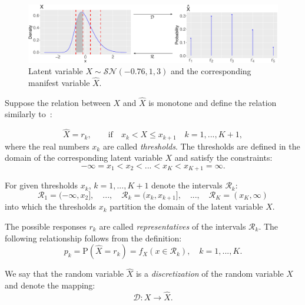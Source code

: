 \documentclass[10pt]{article}
\begin{document}
\begin{figure}[t]
	\centering
	\includegraphics[width=\textwidth]{model.pdf}
	\caption{ Latent variable $X \sim \mathcal{SN}(-0.76, 1, 3)$ and the corresponding manifest variable $\hat{X}$.}
	\label{fig: model}
\end{figure}

Suppose the relation between $X$ and $\hat{X}$ is monotone and define the relation similarly to~\cite{Boari}:

\begin{equation} \label{eq: definicija}
\hat{X} = r_{k}, \qquad \text{if} \quad x_{k} < X \leq x_{k+1} \quad k = 1, ..., K+1,
\end{equation}
where the real numbers $x_{k}$ are called {\it thresholds}. The thresholds are defined in the domain of the corresponding latent variable $X$ and satisfy the constraints:
\begin{equation} \label{eq: constraints}
-\infty = x_{1} < x_{2} < ... < x_{K} < x_{K + 1} = \infty.
\end{equation}

For given thresholds $x_{k}$, $k = 1,...,K+1$ denote the intervals $\mathcal{R}_{k}$:  
\begin{equation}
\mathcal{R}_{1} = (-\infty, x_{2}], \quad ..., \quad \mathcal{R}_{k} = (x_{k}, x_{k+1}], \quad ..., \quad \mathcal{R}_{K} = (x_{K}, \infty)
\end{equation}
into which the thresholds $x_{k}$ partition the domain of the latent variable $X$.

The possible responses $r_{k}$ are called {\it representatives} of the intervals $\mathcal{R}_{k}$. The following relationship follows from the definition:
\begin{equation}
p_{k} = \mathrm{P}(\hat{X} = r_{k}) = f_{X}(x \in \mathcal{R}_{k}), \quad k = 1, ..., K. 
\end{equation}

We say that the random variable $\hat{X}$ is a {\it discretization} of the random variable $X$ and denote the mapping:
\begin{equation}
\mathcal{D}: X \rightarrow \hat{X}.
\end{equation}
\end{document}
